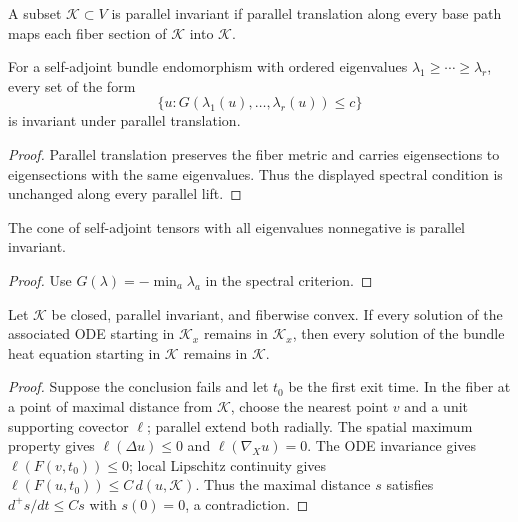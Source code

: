 \begin{definition}
\label{def:chow-ii-parallel-invariant-set}
A subset $\mathcal K\subset V$ is parallel invariant if parallel translation along
every base path maps each fiber section of $\mathcal K$ into $\mathcal K$.
\end{definition}

\begin{lemma}
\label{lem:chow-ii-spectral-invariance}
For a self-adjoint bundle endomorphism with ordered eigenvalues
$\lambda_1\ge\cdots\ge\lambda_r$, every set of the form
\[
\{u:G(\lambda_1(u),\ldots,\lambda_r(u))\le c\}
\]
is invariant under parallel translation.
\end{lemma}
\begin{proof}
Parallel translation preserves the fiber metric and carries eigensections to
eigensections with the same eigenvalues.  Thus the displayed spectral condition
is unchanged along every parallel lift.
\end{proof}

\begin{corollary}
\label{cor:chow-ii-nonnegative-tensor-cone}
The cone of self-adjoint tensors with all eigenvalues nonnegative is parallel
invariant.
\end{corollary}
\begin{proof}
Use $G(\lambda)=-\min_a\lambda_a$ in the spectral criterion.
\end{proof}

\begin{theorem}
\label{thm:chow-ii-system-wmp}
Let $\mathcal K$ be closed, parallel invariant, and fiberwise convex.  If every
solution of the associated ODE starting in $\mathcal K_x$ remains in
$\mathcal K_x$, then every solution of the bundle heat equation starting in
$\mathcal K$ remains in $\mathcal K$.
\end{theorem}
\begin{proof}
Suppose the conclusion fails and let $t_0$ be the first exit time.  In the fiber
at a point of maximal distance from $\mathcal K$, choose the nearest point $v$
and a unit supporting covector $\ell$; parallel extend both radially.  The
spatial maximum property gives $\ell(\Delta u)\le0$ and
$\ell(\nabla_Xu)=0$.  The ODE invariance gives $\ell(F(v,t_0))\le0$; local
Lipschitz continuity gives $\ell(F(u,t_0))\le C\,d(u,\mathcal K)$.  Thus the
maximal distance $s$ satisfies $d^+s/dt\le Cs$ with $s(0)=0$, a contradiction.
\end{proof}

